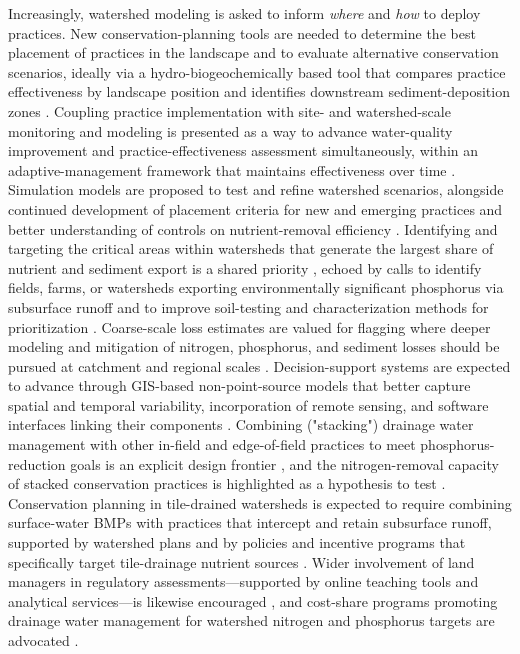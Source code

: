 Increasingly, watershed modeling is asked to inform \emph{where} and \emph{how} to deploy practices. New conservation-planning tools are needed to determine the best placement of practices in the landscape and to evaluate alternative conservation scenarios, ideally via a hydro-biogeochemically based tool that compares practice effectiveness by landscape position and identifies downstream sediment-deposition zones \parencite{Kröger2013}. Coupling practice implementation with site- and watershed-scale monitoring and modeling is presented as a way to advance water-quality improvement and practice-effectiveness assessment simultaneously, within an adaptive-management framework that maintains effectiveness over time \parencite{Kröger2013}. Simulation models are proposed to test and refine watershed scenarios, alongside continued development of placement criteria for new and emerging practices and better understanding of controls on nutrient-removal efficiency \parencite{Tomer2015}. Identifying and targeting the critical areas within watersheds that generate the largest share of nutrient and sediment export is a shared priority \parencite{Lemke2011}, echoed by calls to identify fields, farms, or watersheds exporting environmentally significant phosphorus via subsurface runoff and to improve soil-testing and characterization methods for prioritization \parencite{Sims1998}. Coarse-scale loss estimates are valued for flagging where deeper modeling and mitigation of nitrogen, phosphorus, and sediment losses should be pursued at catchment and regional scales \parencite{McDowell2021}. Decision-support systems are expected to advance through GIS-based non-point-source models that better capture spatial and temporal variability, incorporation of remote sensing, and software interfaces linking their components \parencite{Djodjic2002}. Combining ("stacking") drainage water management with other in-field and edge-of-field practices to meet phosphorus-reduction goals is an explicit design frontier \parencite{King2022}, and the nitrogen-removal capacity of stacked conservation practices is highlighted as a hypothesis to test \parencite{Roley2016}. Conservation planning in tile-drained watersheds is expected to require combining surface-water BMPs with practices that intercept and retain subsurface runoff, supported by watershed plans and by policies and incentive programs that specifically target tile-drainage nutrient sources \parencite{Lemke2011}. Wider involvement of land managers in regulatory assessments---supported by online teaching tools and analytical services---is likewise encouraged \parencite{Stutter2018}, and cost-share programs promoting drainage water management for watershed nitrogen and phosphorus targets are advocated \parencite{Sunohara2015}.

